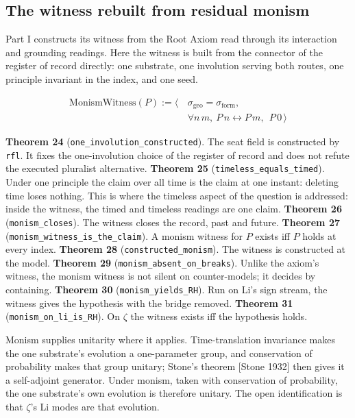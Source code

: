 \documentclass[10pt]{article}
\begin{document}
\hypertarget{the-witness-rebuilt-from-residual-monism}{%
\subsection{The witness rebuilt from residual
monism}\label{the-witness-rebuilt-from-residual-monism}}

Part I constructs its witness from the Root Axiom read through its
interaction and grounding readings. Here the witness is built from the
connector of the register of record directly: one substrate, one
involution serving both routes, one principle invariant in the index,
and one seed.

\[\begin{aligned}\mathrm{MonismWitness}(P) := \big\langle\, &\sigma_{\mathrm{geo}} = \sigma_{\mathrm{form}},\\ &\forall n\, m,\ P\,n \leftrightarrow P\,m,\ \ P\,0 \,\big\rangle\end{aligned}\]

\textbf{Theorem 24} (\texttt{one\_involution\_constructed}). The seat
field is constructed by \texttt{rfl}. It fixes the one-involution choice
of the register of record and does not refute the executed pluralist
alternative. \textbf{Theorem 25} (\texttt{timeless\_equals\_timed}).
Under one principle the claim over all time is the claim at one instant:
deleting time loses nothing. This is where the timeless aspect of the
question is addressed: inside the witness, the timed and timeless
readings are one claim. \textbf{Theorem 26} (\texttt{monism\_closes}).
The witness closes the record, past and future. \textbf{Theorem 27}
(\texttt{monism\_witness\_is\_the\_claim}). A monism witness for \(P\)
exists iff \(P\) holds at every index. \textbf{Theorem 28}
(\texttt{constructed\_monism}). The witness is constructed at the model.
\textbf{Theorem 29} (\texttt{monism\_absent\_on\_breaks}). Unlike the
axiom's witness, the monism witness is not silent on counter-models; it
decides by containing. \textbf{Theorem 30}
(\texttt{monism\_yields\_RH}). Run on Li's sign stream, the witness
gives the hypothesis with the bridge removed. \textbf{Theorem 31}
(\texttt{monism\_on\_li\_is\_RH}). On \(\zeta\) the witness exists iff
the hypothesis holds.

Monism supplies unitarity where it applies. Time-translation invariance
makes the one substrate's evolution a one-parameter group, and
conservation of probability makes that group unitary; Stone's theorem
{[}Stone 1932{]} then gives it a self-adjoint generator. Under monism,
taken with conservation of probability, the one substrate's own
evolution is therefore unitary. The open identification is that
\(\zeta\)'s Li modes are that evolution.
\end{document}
